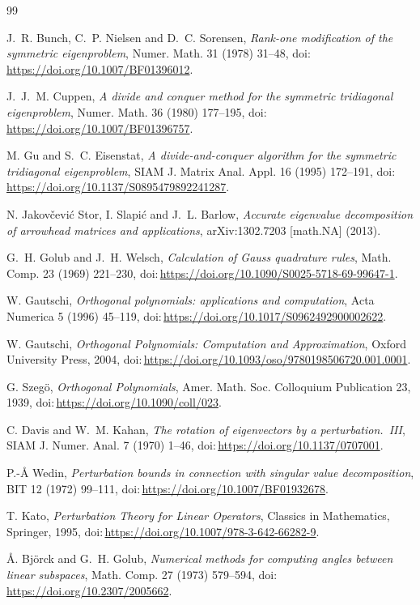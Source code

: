 \documentclass[11pt]{article}
\providecommand{\doi}[1]{\mbox{doi:}\,\url{https://doi.org/#1}}
\theoremstyle{remark}
\begin{document}
\begin{thebibliography}{99}
\small

J.~R. Bunch, C.~P. Nielsen and D.~C. Sorensen, \emph{Rank-one modification of the symmetric
eigenproblem}, Numer. Math. 31 (1978) 31--48, \doi{10.1007/BF01396012}.

J.~J.~M. Cuppen, \emph{A divide and conquer method for the symmetric tridiagonal eigenproblem},
Numer. Math. 36 (1980) 177--195, \doi{10.1007/BF01396757}.

M. Gu and S.~C. Eisenstat, \emph{A divide-and-conquer algorithm for the symmetric tridiagonal
eigenproblem}, SIAM J. Matrix Anal. Appl. 16 (1995) 172--191, \doi{10.1137/S0895479892241287}.

N. Jakov\v{c}evi\'{c} Stor, I. Slapi\'{c} and J.~L. Barlow, \emph{Accurate eigenvalue decomposition of
arrowhead matrices and applications}, arXiv:1302.7203 [math.NA] (2013).

G.~H. Golub and J.~H. Welsch, \emph{Calculation of Gauss quadrature rules}, Math. Comp. 23 (1969)
221--230, \doi{10.1090/S0025-5718-69-99647-1}.

W. Gautschi, \emph{Orthogonal polynomials: applications and computation}, Acta Numerica 5 (1996)
45--119, \doi{10.1017/S0962492900002622}.

W. Gautschi, \emph{Orthogonal Polynomials: Computation and Approximation}, Oxford University Press,
2004, \doi{10.1093/oso/9780198506720.001.0001}.

G. Szeg\"{o}, \emph{Orthogonal Polynomials}, Amer. Math. Soc. Colloquium Publication 23, 1939,
\doi{10.1090/coll/023}.

C. Davis and W.~M. Kahan, \emph{The rotation of eigenvectors by a perturbation.~III}, SIAM J. Numer.
Anal. 7 (1970) 1--46, \doi{10.1137/0707001}.

P.-\AA{} Wedin, \emph{Perturbation bounds in connection with singular value decomposition}, BIT 12
(1972) 99--111, \doi{10.1007/BF01932678}.

T. Kato, \emph{Perturbation Theory for Linear Operators}, Classics in Mathematics, Springer, 1995,
\doi{10.1007/978-3-642-66282-9}.

{\AA}. Bj\"{o}rck and G.~H. Golub, \emph{Numerical methods for computing angles between linear
subspaces}, Math. Comp. 27 (1973) 579--594, \doi{10.2307/2005662}.


\end{thebibliography}
\end{document}
